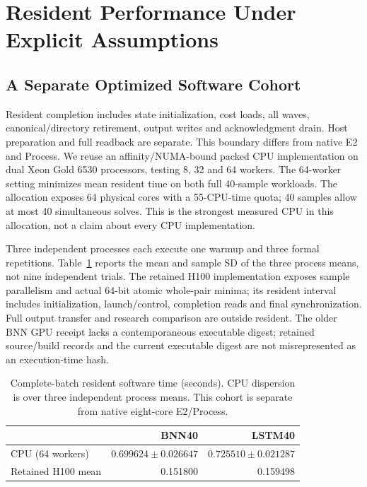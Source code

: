 \section{Resident Performance Under Explicit Assumptions}
\subsection{A Separate Optimized Software Cohort}
Resident completion includes state initialization, cost loads, all waves, canonical/directory retirement, output writes and acknowledgment drain. Host preparation and full readback are separate. This boundary differs from native E2 and Process. We reuse an affinity/NUMA-bound packed CPU implementation on dual Xeon Gold 6530 processors, testing 8, 32 and 64 workers. The 64-worker setting minimizes mean resident time on both full 40-sample workloads. The allocation exposes 64 physical cores with a 55-CPU-time quota; 40 samples allow at most 40 simultaneous solves. This is the strongest measured CPU in this allocation, not a claim about every CPU implementation.

Three independent processes each execute one warmup and three formal repetitions. Table~\ref{tab:resident} reports the mean and sample SD of the three process means, not nine independent trials. The retained H100 implementation exposes sample parallelism and actual 64-bit atomic whole-pair minima; its resident interval includes initialization, launch/control, completion reads and final synchronization. Full output transfer and research comparison are outside resident. The older BNN GPU receipt lacks a contemporaneous executable digest; retained source/build records and the current executable digest are not misrepresented as an execution-time hash.

\begin{table}[t]\centering
\caption{Complete-batch resident software time (seconds). CPU dispersion is over three independent process means. This cohort is separate from native eight-core E2/Process.}\label{tab:resident}
\setlength{\tabcolsep}{4pt}
\begin{tabular}{lrr}\toprule & BNN40 & LSTM40\\\midrule
CPU (64 workers) & $0.699624\pm0.026647$ & $0.725510\pm0.021287$\\
Retained H100 mean & 0.151800 & 0.159498\\
\bottomrule\end{tabular}
\end{table}

